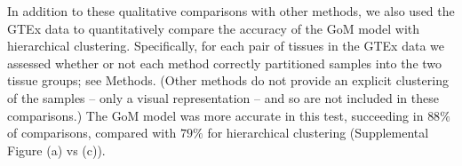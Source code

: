 \documentclass[10pt,letterpaper]{article}
\begin{document}
In addition to these qualitative comparisons with other methods, we also used the GTEx data to quantitatively compare the accuracy of the GoM model with
hierarchical clustering. Specifically, for each pair of tissues in the GTEx data we assessed whether or not each method correctly partitioned samples into the two tissue groups; see Methods. (Other methods do not provide an explicit clustering of the samples -- only a visual representation -- and so are not included in these comparisons.) The GoM model was more accurate in this test, succeeding in $88 \%$ of comparisons, compared with $79 \%$ for hierarchical clustering (Supplemental Figure  (a) vs (c)).

\end{document}
